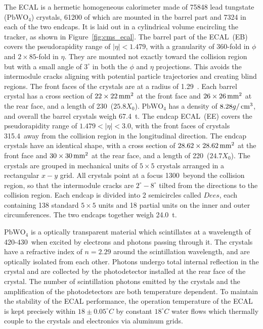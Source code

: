 The ECAL is a hermetic homogeneous calorimeter made of 75848 lead tungstate ($\text{PbWO}_{4}$) crystals,
61200 of which are mounted in the barrel part and 7324 in each of the two endcaps.
It is laid out in a cylindrical volume encircling the tracker, as shown in Figure~\ref{fig:cms_ecal}. 
The barrel part of the ECAL~(EB) covers the pseudorapidity range of $|\eta| < 1.479$, 
with a granularity of 360-fold in $\phi$ and $2 \times 85$-fold in $\eta$.
They are mounted not exactly toward the collision region but with a small angle of $3^{\circ}$ in both the $\phi$ and $\eta$ projections.
This avoids the intermodule cracks aligning with potential particle trajectories and creating blind regions.
The front faces of the crystals are at a radius of 1.29~\meter.
Each barrel crystal has a cross section of $22 \times 22 \,\text{mm}^{2}$ at the front face and $26 \times 26 \,\text{mm}^{2}$ at the rear face, and a length of 230~\mm ($25.8 X_{0}$). 
$\text{PbWO}_{4}$ has a density of $8.28 g/\,\text{cm}^{3}$, and overall the barrel crystals weigh 67.4~t.
The endcap ECAL~(EE) covers the pseudorapidity range of $1.479 < |\eta| < 3.0$,
with the front faces of crystals 315.4~\cm away from the collision region in the longitudinal direction. 
The endcap crystals have an identical shape, with a cross section of $28.62 \times 28.62 \,\text{mm}^{2}$ at the front face and $30 \times 30 \,\text{mm}^{2}$ at the rear face, and a length of 220~\mm ($24.7 X_{0}$).
The crystals are grouped in mechanical units of $5 \times 5$ crystals arranged in a rectangular $x-y$ grid.
All crystals point at a focus 1300~\mm beyond the collision region, 
so that the intermodule cracks are $2^{\circ} - 8^{\circ}$ tilted from the directions to the collision region.
Each endcap is divided into 2 semicircles called $Dees$, each containing 138 standard $5 \times 5$ units and 18 partial units on the inner and outer circumferences.
The two endcaps together weigh 24.0~t.

$\text{PbWO}_{4}$ is a optically transparent material which scintillates at a wavelength of 420-430~\nm when excited by electrons and photons passing through it.
The crystals have a refractive index of $n = 2.29$ around the scintillation wavelength, and are optically isolated from each other.
Photons undergo total internal reflection in the crystal and are collected by the photodetector installed at the rear face of the crystal.  
The number of scintillation photons emitted by the crystals and the amplification of the photodetectors are both temperature dependent.
To maintain the stability of the ECAL performance, the operation temperature of the ECAL is kept precisely within $18 \pm 0.05^{\circ}C$
by constant $18^{\circ}C$ water flows which thermally couple to the crystals and electronics via aluminum grids.

